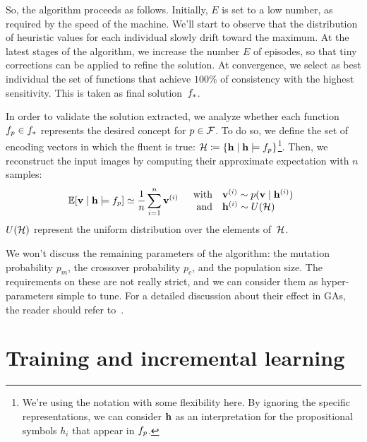 So, the algorithm proceeds as follows. Initially, $E$ is set to a low number,
as required by the speed of the machine. We'll start to observe that the
distribution of heuristic values for each individual slowly drift toward the
maximum. At the latest stages of the algorithm, we increase the number $E$ of
episodes, so that tiny corrections can be applied to refine the solution.
At convergence, we select as best individual the set of functions that achieve
$100\%$ of consistency with the highest sensitivity. This is taken as final
solution~${f}_*$.

In order to validate the solution extracted, we analyze whether each function
$f_p \in {f}_*$ represents the desired concept for $p \in
\mathcal{F}$. To do so, we define the set of encoding vectors in which the fluent
is true: $\mathcal{H} \coloneqq \{ \mathbf{h} \mid \mathbf{h} \models f_p
\}$\footnote{We're using the notation with some flexibility here. By ignoring
the specific representations, we can consider $\mathbf{h}$ as an interpretation for
the propositional symbols $h_i$ that appear in $f_p$.}.  Then, we
reconstruct the input images by computing their approximate expectation with
$n$ samples:
\begin{equation}
	\mathbb{E}[\mathbf{v} \mid \mathbf{h} \models f_p] \simeq 
		\frac{1}{n} \sum_{i=1}^n \mathbf{v}^{(i)} \quad
		\begin{array}{rl}
			\text{with} & 
			\mathbf{v}^{(i)} \sim p(\mathbf{v} \mid \mathbf{h}^{(i)}) \\
			\text{and} & 
			\mathbf{h}^{(i)} \sim U(\mathcal{H}) \\
		\end{array}
		\label{eq:backprop-input-features}
\end{equation}
$U(\mathcal{H})$ represent the uniform distribution over the elements
of~$\mathcal{H}$.

We won't discuss the remaining parameters of the algorithm: the mutation
probability $p_m$, the crossover probability $p_c$, and the population size.
The requirements on these are not really strict, and we can consider them as
hyper-parameters simple to tune. For a detailed discussion about their effect
in GAs, the reader should refer to~\cite{bib:ga-mutations-review}.


\section{Training and incremental learning}

\label{sec:training-incremental}

